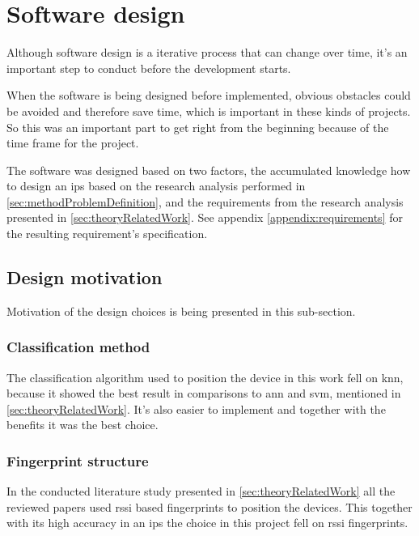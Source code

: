 \section{Software design}\label{sec:methodSoftwareDesign}
Although software design is a iterative process that can change over time, it's an important step to conduct before the development starts. \cite{EngineeringDesignIts1989, ImportanceBusinessProcess2008}

\bigskip

When the software is being designed before implemented, obvious obstacles could be avoided and therefore save time, which is important in these kinds of projects.
So this was an important part to get right from the beginning because of the time frame for the project.

\bigskip

The software was designed based on two factors, the accumulated knowledge how to design an \acrshort{ips} based on the research analysis performed in \cref{sec:methodProblemDefinition}, and the requirements from the research analysis presented in \cref{sec:theoryRelatedWork}.
See appendix \ref{appendix:requirements} for the resulting requirement's specification.


\subsection{Design motivation}\label{sec:methodDesignMotivation}
Motivation of the design choices is being presented in this sub-section.


\subsubsection{Classification method}\label{sec:methodSoftwareDesignClassification}
The classification algorithm used to position the device in this work fell on \acrshort{knn}, because it showed the best result in comparisons to \acrshort{ann} and \acrshort{svm}, mentioned in \cref{sec:theoryRelatedWork}.
It's also easier to implement and together with the benefits it was the best choice.


\subsubsection{Fingerprint structure}\label{sec:methodSoftwareDesignFingerprint}
In the conducted literature study presented in \cref{sec:theoryRelatedWork} all the reviewed papers used \acrfull{rssi} based fingerprints to position the devices.
This together with its high accuracy in an \acrshort{ips} the choice in this project fell on \acrshort{rssi} fingerprints.



